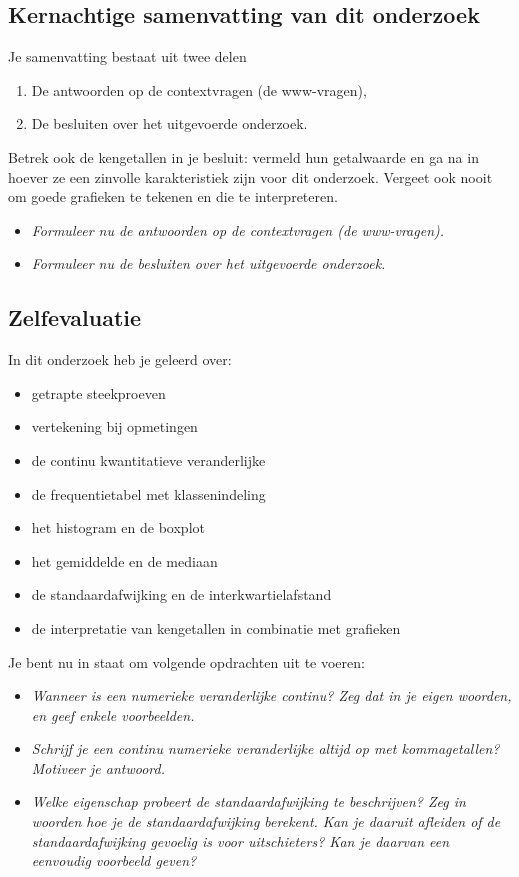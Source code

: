 \documentclass[11pt]{article}
\newcommand{\vraag}[2]{\begin{itemize}\item {\it #1} \vspace*{#2}\end{itemize}}
\begin{document}
\subsection{Kernachtige samenvatting van dit onderzoek}

Je samenvatting bestaat uit twee delen
\begin{enumerate}
  \item De antwoorden op de contextvragen (de www-vragen),
  \item De besluiten over het uitgevoerde onderzoek.
\end{enumerate}

Betrek ook de kengetallen in je besluit: vermeld hun getalwaarde en ga na in hoever ze een zinvolle
karakteristiek zijn voor dit onderzoek. Vergeet ook nooit om goede grafieken te tekenen en die te
interpreteren.

\vraag{Formuleer nu de antwoorden op de contextvragen (de www-vragen).}{6cm}

\vraag{Formuleer nu de besluiten over het uitgevoerde onderzoek.}{6cm}

\subsection{Zelfevaluatie}

In dit onderzoek heb je geleerd over:
\begin{itemize}
  \item getrapte steekproeven
  \item vertekening bij opmetingen
  \item de continu kwantitatieve veranderlijke
  \item de frequentietabel met klassenindeling
  \item het histogram en de boxplot
  \item het gemiddelde en de mediaan
  \item de standaardafwijking en de interkwartielafstand
  \item de interpretatie van kengetallen in combinatie met grafieken
\end{itemize}

Je bent nu in staat om volgende opdrachten uit te voeren:
\vraag{Wanneer is een numerieke veranderlijke continu? Zeg dat in je eigen woorden, en geef
enkele voorbeelden.}{4cm}

\vraag{Schrijf je een continu numerieke veranderlijke altijd op met kommagetallen? Motiveer je
antwoord.}{4cm}

\vraag{Welke eigenschap probeert de standaardafwijking te beschrijven? Zeg in woorden hoe je de
standaardafwijking berekent. Kan je daaruit afleiden of de standaardafwijking gevoelig is
voor uitschieters? Kan je daarvan een eenvoudig voorbeeld geven?}{8cm}
\end{document}
